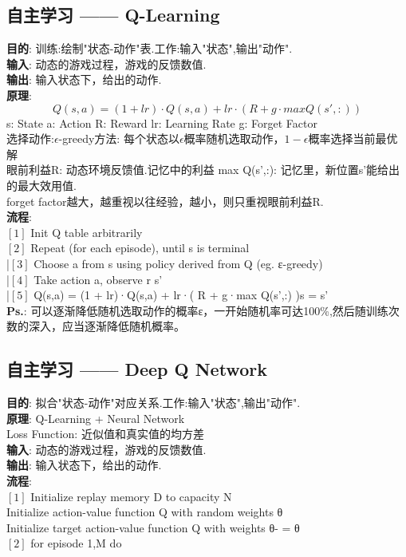 \documentclass{article}
\begin{document}
\subsection{自主学习 —— Q-Learning}
\textbf{目的}: 训练:绘制"状态-动作"表.\quad 工作:输入"状态",输出"动作".\\
\textbf{输入}: 动态的游戏过程，游戏的反馈数值.\\
\textbf{输出}: 输入状态下，给出的动作.\\
\textbf{原理}:
$$ Q(s,a) = (1 + lr)·Q(s,a) + lr·( R + g·max Q(s',:) ) $$
s: State \quad a: Action \quad R: Reward \quad lr: Learning Rate \quad g: Forget Factor \\
选择动作:$\epsilon$-greedy方法: 每个状态以$\epsilon$概率随机选取动作，$1 - \epsilon$概率选择当前最优解\\
眼前利益R: 动态环境反馈值.\quad 记忆中的利益 max Q(s',:): 记忆里，新位置s'能给出的最大效用值.\\
forget factor越大，越重视以往经验，越小，则只重视眼前利益R.\\
\textbf{流程}:\\
$[1]$ Init Q table arbitrarily\\
$[2]$ Repeat (for each episode), until s is terminal\\
|\quad $[3]$ Choose a from s using policy derived from Q (eg. ε-greedy)\\
|\quad $[4]$ Take action a, observe r s'\\
|\quad $[5]$ Q(s,a) = (1 + lr)·Q(s,a) + lr·( R + g·max Q(s',:) )\quad s = s'\\
\textbf{Ps.}:
可以逐渐降低随机选取动作的概率ε，一开始随机率可达100\%,然后随训练次数的深入，应当逐渐降低随机概率。


\subsection{自主学习 —— Deep Q Network}
\textbf{目的}: 拟合"状态-动作"对应关系.\quad 工作:输入"状态",输出"动作".\\
\textbf{原理}: Q-Learning + Neural Network\\
Loss Function: 近似值和真实值的均方差\\
\textbf{输入}: 动态的游戏过程，游戏的反馈数值.\\
\textbf{输出}: 输入状态下，给出的动作.\\
\textbf{流程}:\\
$[1]$ Initialize replay memory D to capacity N\\
    Initialize action-value function Q with random weights θ\\
    Initialize target action-value function Q with weights θ- = θ\\
$[2]$ for episode 1,M do\\
\end{document}
